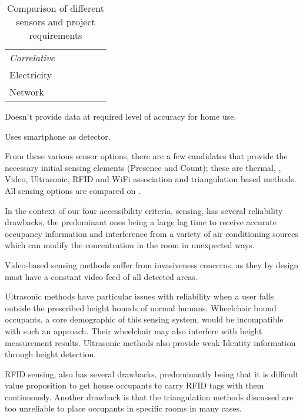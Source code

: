 \documentclass[../thesis/thesis.tex]{subfiles}
\begin{document}
\begin{table}
\begin{threeparttable}
\begin{tabularx}{\textwidth}{|l|l|l||l||l|l|}
\hspace{3mm}\textit{Correlative} 	& & & & & \\
\hspace{8mm}Electricity 		& \cmark\ssup & \xmark & \cmark & & \\
\hspace{8mm}Network			& \cmark\ssup & \xmark & \cmark & & \\

\cline{1-6}
\end{tabularx}
\begin{tablenotes}
\item \ssup  Doesn't provide data at required level of accuracy for home use.
\item \tsup  Uses smartphone as detector.
\end{tablenotes}
\end{threeparttable}
\caption{Comparison of different sensors and project requirements}
\label{tab:litreview:taxonomycomp}
\end{table}

From these various sensor options, there are a few candidates that provide the necessary initial sensing elements (Presence and Count); these are thermal, \cdi, Video, Ultrasonic, RFID and WiFi association and triangulation based methods. All sensing options are compared on .

In the context of our four accessibility criteria, \cdi sensing, has several reliability drawbacks, the predominant ones being a large lag time to receive accurate occupancy information and interference from a variety of air conditioning sources which can modify the \cdi concentration in the room in unexpected ways.

Video-based sensing methods suffer from invasiveness concerns, as they by design must have a constant video feed of all detected areas.

Ultrasonic methods have particular issues with reliability when a user falls outside the prescribed height bounds of normal humans. Wheelchair bound occupants, a core demographic of this sensing system, would be incompatible with such an approach. Their wheelchair may also interfere with height measurement results. Ultrasonic methods also provide weak Identity information through height detection.

RFID sensing, also has several drawbacks, predominantly being that it is difficult value proposition to get house occupants to carry RFID tags with them continuously. Another drawback is that the triangulation methods discussed are too unreliable to place occupants in specific rooms in many cases.
\end{document}

